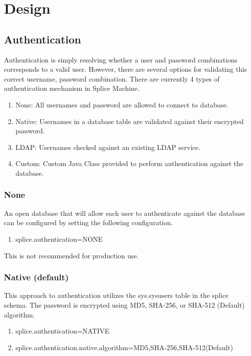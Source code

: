 \section{Design}

\subsection{Authentication}

Authentication is simply resolving whether a user and password combinations
corresponds to a valid user.  However, there are several options for validating
this correct username, password combination.  There are currently 4 types of
authentication mechanism in Splice Machine.
\begin{enumerate}
        \item None: All usernames and password are allowed to connect to database.
        \item Native: Usernames in a database table are validated against their
        encrypted password.
        \item LDAP: Usernames checked against an existing LDAP service.
        \item Custom: Custom Java Class provided to perform authentication against the
        database.
\end{enumerate}

\subsubsection{None}
An open database that will allow each user to authenticate against the database
can be configured by setting the following configuration.

\begin{enumerate}
        \item splice.authentication=NONE
\end{enumerate}

This is not recommended for production use.


\subsubsection{Native (default)}
This approach to authentication utilizes the sys.sysusers table in the splice
schema.  The password is encrypted using MD5, SHA-256, or
SHA-512 (Default) algorithm.   

\begin{enumerate}
        \item splice.authentication=NATIVE
      \item splice.authentication.native.algorithm=MD5,SHA-256,SHA-512(Default)
\end{enumerate}

